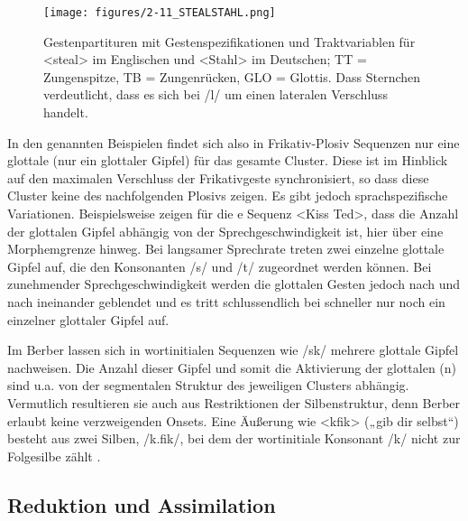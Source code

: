 \begin{figure}
	\texttt{[image: figures/2-11\_STEALSTAHL.png]}
	\caption{Gestenpartituren mit Gestenspezifikationen und Traktvariablen für <steal> im Englischen und <Stahl> im Deutschen; TT = Zungenspitze, TB = Zungenrücken, GLO = Glottis. Dass Sternchen verdeutlicht, dass es sich bei /l/ um einen lateralen Verschluss handelt.}
	\label{figure:0211}
\end{figure}

\largerpage
In den genannten Beispielen findet sich also in Frikativ-Plosiv Sequenzen nur eine glottale  (nur ein glottaler Gipfel) für das gesamte Cluster. Diese  ist im Hinblick auf den maximalen Verschluss der Frikativgeste synchronisiert, so dass diese Cluster keine  des nachfolgenden Plosivs zeigen. Es gibt jedoch sprachspezifische Variationen. Beispielsweise zeigen \citet{Munhall1988} für die e Sequenz <Kiss Ted>, dass die Anzahl der glottalen Gipfel abhängig von der Sprechgeschwindigkeit ist, hier über eine Morphemgrenze hinweg. Bei langsamer Sprechrate treten zwei einzelne glottale Gipfel auf, die den Konsonanten /s/ und /t/ zugeordnet werden können. Bei zunehmender Sprechgeschwindigkeit werden die glottalen Gesten jedoch nach und nach ineinander geblendet und es tritt schlussendlich bei schneller  nur noch ein einzelner glottaler Gipfel auf. 

Im  Berber \citep{Ridouane2006} lassen sich in wortinitialen Sequenzen wie /sk/ mehrere glottale Gipfel nachweisen. Die Anzahl dieser Gipfel und somit die Aktivierung der glottalen (n) sind u.a. von der segmentalen Struktur des jeweiligen Clusters abhängig. Vermutlich resultieren sie auch aus Restriktionen der Silbenstruktur, denn  Berber erlaubt keine verzweigenden Onsets. Eine Äußerung wie <kfik> („gib dir selbst“) besteht aus zwei Silben, /k.fik/, bei dem der wortinitiale Konsonant /k/ nicht zur Folgesilbe zählt \citep{Hermes2011b,Hermes2011a}. 


\subsection{Reduktion und Assimilation}
\label{subsec:020202}

